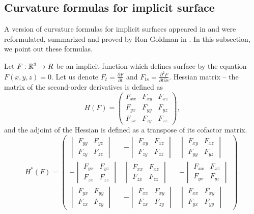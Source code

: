 \subsection{Curvature formulas for implicit surface}

A version of curvature formulas for implicit surfaces appeared in \cite{spivak1975comprehensive}
and were reformulated, summarized and proved by Ron Goldman in \cite{goldman2005curvature}.
In this subsection, we point out these formulas.

Let $F:\R^3 \to R$ be an implicit function which defines surface by the equation $F(x, y, z) = 0$. 
Let us denote $F_t = \frac{\partial F}{\partial t}$ and $F_{ts} = \frac{\partial^2 F}{\partial t \partial s}$.
Hessian matrix -- the matrix of the second-order derivatives is defined as 
$$
H(F) = 
\begin{pmatrix}
    F_{xx} & F_{xy} & F_{xz} \\
    F_{yx} & F_{yy} & F_{yz} \\
    F_{zx} & F_{zy} & F_{zz}
\end{pmatrix},
$$
and the adjoint of the Hessian is defined as a transpose of its cofactor matrix.
$$
H^*(F) = 
\begin{pmatrix}
    \begin{vmatrix} F_{yy} & F_{yz} \\ F_{zy} & F_{zz} \end{vmatrix} & 
    -\begin{vmatrix} F_{xy} & F_{xz} \\ F_{zy} & F_{zz} \end{vmatrix} &
    \begin{vmatrix} F_{xy} & F_{xz} \\ F_{yy} & F_{yz} \end{vmatrix} \\

    -\begin{vmatrix} F_{yx} & F_{yz} \\ F_{zx} & F_{zz} \end{vmatrix} &
    \begin{vmatrix} F_{xx} & F_{xz} \\ F_{zx} & F_{zz} \end{vmatrix} & 
    -\begin{vmatrix} F_{xx} & F_{xz} \\ F_{yx} & F_{yz} \end{vmatrix} \\

    \begin{vmatrix} F_{yx} & F_{yy} \\ F_{zx} & F_{zy} \end{vmatrix} & 
    -\begin{vmatrix} F_{xx} & F_{xy} \\ F_{zx} & F_{zy} \end{vmatrix} & 
    \begin{vmatrix} F_{xx} & F_{xy} \\ F_{yx} & F_{yy} \end{vmatrix}
\end{pmatrix}.
$$

